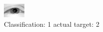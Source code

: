 \begin{figure}[h!]
\begin{center}
\includegraphics[width=0.60\columnwidth]{figures/ID2330_class_1_target_2.png}
\end{center}
\caption{ Classification: 1 actual target: 2}
\label{fig:ID2330_class_1_target_2}
\end{figure}
